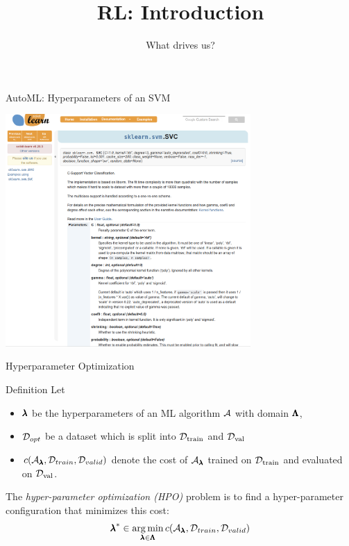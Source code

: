 \documentclass[aspectratio=169]{../latex_main/tntbeamer}  %
\title[ML-RL: Big Picture]{RL: Introduction}
\subtitle{What drives us?}
\begin{document}
	
	\maketitle

\begin{frame}[c]{AutoML: Hyperparameters of an SVM}
	
	\centering
	\includegraphics[width=0.7\textwidth]{images/sklearn_svm_doc.png}
	
\end{frame}
\begin{frame}[c]{Hyperparameter Optimization}
	
	\begin{block}{Definition}
		Let 
		\begin{itemize}
			\item $\pmb{\lambda}$ be the hyperparameters of an ML algorithm $\mathcal{A}$ with domain $\pmb{\Lambda}$,
			\pause
			\item $\mathcal{D}_{opt}$ be a dataset which is split into $\mathcal{D}_{\text{train}}$ and $\mathcal{D}_{\text{val}}$ 
			\pause
			\item $c(\mathcal{A}_{\pmb{\lambda}}, \mathcal{D}_{train}, \mathcal{D}_{valid})$ denote the cost of $\mathcal{A}_{\pmb{\lambda}}$ trained on $\mathcal{D}_{\text{train}}$ and evaluated on $\mathcal{D}_{\text{val}}$.
		\end{itemize}
		\pause
		The \emph{hyper-parameter optimization (HPO)} problem is to find a hyper-parameter configuration that minimizes this cost:
		\begin{equation}
		{\pmb{\lambda}}^* \in \operatorname*{arg\,min}_{\pmb{\lambda} \in \pmb{\Lambda}} c(\mathcal{A}_{\pmb{\lambda}}, \mathcal{D}_{train}, \mathcal{D}_{valid}) \nonumber  
		\end{equation}
	\end{block}
	
\end{frame}
\end{document}
